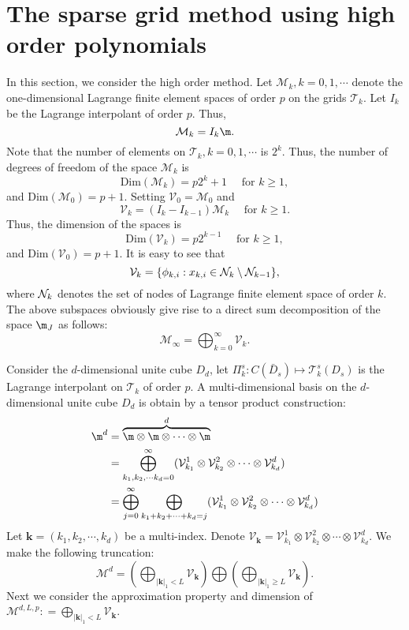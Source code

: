 \section{The sparse grid method using high order polynomials}
In this section, we consider the high order method. Let $\mathcal{M}_k, k =0,1,\cdots $ denote the one-dimensional Lagrange finite element spaces of order $p$ on the grids $\mathcal{T}_k$.  Let $I_k$ be the Lagrange interpolant of order $p$. Thus,
$$
\mathcal{M}_k = I_k\m.
$$
Note that the number of elements on  $\mathcal{T}_k, k = 0,1,\cdots$ is $2^k$. Thus, the number of degrees of freedom of the space $\mathcal{M}_k$ is
$$
\text{Dim}(\mathcal{M}_k) = p2^k+1 \quad \text{ for } k\ge 1,
$$
and $\text{Dim}(\mathcal{M}_0)=p+1$. 
Setting $\mathcal{V}_0= \mathcal{M}_0$ and 
$$
\mathcal{V}_k=(I_k - I_{k-1}) \mathcal{M}_k  \quad \text{ for } k\ge 1.
$$ 
Thus, the dimension of the spaces is 
$$
\text{Dim}(\mathcal{V}_k) = p2^{k-1} \quad \text{ for } k\ge 1,
$$
and $\text{Dim}(\mathcal{V}_0)=p+1$. It is easy to see that
\begin{equation}\label{hbk}
\mathcal V_k=\{\phi_{k,i}: x_{k,i}\in {\cal N}_k\setminus {\cal N}_{k-1}\},
\end{equation}
where ${\cal N}_k$ denotes the set of nodes of Lagrange finite element space of order $k$.  The above subspaces obviously give rise to a direct sum decomposition of the space $\m_J$ as follows:
$$
        \mathcal M_\infty=\bigoplus_{k=0}^\infty \mathcal V_k.
$$

Consider the $d$-dimensional unite cube $D_d$, let $\Pi_k^s: C(\bar D_s)\mapsto \mathcal{T}_k^s(D_s)$ is the Lagrange interpolant on $\mathcal{T}_k$ of order $p$.  A multi-dimensional basis on the $d$-dimensional unite cube $D_d$ is obtain by a tensor product construction:
\begin{equation}
\begin{aligned}
\m^d &= \overbrace{\m \otimes \m \otimes \cdots \otimes \m }^{d}\\
&= \bigoplus_{k_1,k_2,\cdots k_d=0}^\infty ( \mathcal V_{k_1}^1 \otimes  \mathcal V_{k_2}^2\otimes\cdots \otimes  \mathcal V_{k_d}^d)\\
&= \bigoplus_{j=0}^{\infty}\bigoplus_{k_1+k_2+\cdots + k_d= j} ( \mathcal V_{k_1}^1 \otimes  \mathcal V_{k_2}^2\otimes\cdots \otimes  \mathcal V_{k_d}^d)\\
\end{aligned}
\end{equation}
Let $\mathbf{k}=(k_1,k_2,\cdots,k_d)$ be a multi-index. Denote
$
\mathcal V_{\mathbf{k}} = \mathcal V_{k_1}^1 \otimes  \mathcal V_{k_2}^2\otimes\cdots \otimes  \mathcal V_{k_d}^d.
$
We make the following truncation:
$$
\mathcal{M}^d = \left(\bigoplus_{|\mathbf{k}|_1 < L}\mathcal{V}_{\mathbf{k}} \right) \bigoplus \left(\bigoplus_{|\mathbf{k}|_1 \ge L}\mathcal{V}_{\mathbf{k}} \right). 
$$
Next we consider the approximation property and dimension  of  $\mathcal{M}^{d,L,p} : =\bigoplus_{|\mathbf{k}|_1 < L}\mathcal{V}_{\mathbf{k}}$.


